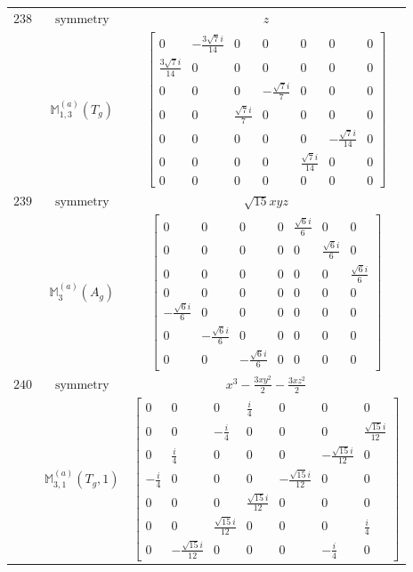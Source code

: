 \documentclass[fleqn,8pt,landscape]{jsarticle}
\begin{document}
\begin{longtable}{ccc}
$ 238 $ & $ \text{symmetry} $ & $ z $ \\
$  $ & $ \mathbb{M}_{1,3}^{(a)}(T_{g}) $ & $ \begin{bmatrix} 0 & - \frac{3 \sqrt{7} i}{14} & 0 & 0 & 0 & 0 & 0 \\ \frac{3 \sqrt{7} i}{14} & 0 & 0 & 0 & 0 & 0 & 0 \\ 0 & 0 & 0 & - \frac{\sqrt{7} i}{7} & 0 & 0 & 0 \\ 0 & 0 & \frac{\sqrt{7} i}{7} & 0 & 0 & 0 & 0 \\ 0 & 0 & 0 & 0 & 0 & - \frac{\sqrt{7} i}{14} & 0 \\ 0 & 0 & 0 & 0 & \frac{\sqrt{7} i}{14} & 0 & 0 \\ 0 & 0 & 0 & 0 & 0 & 0 & 0 \end{bmatrix} $ \\ \hline
$ 239 $ & $ \text{symmetry} $ & $ \sqrt{15} x y z $ \\
$  $ & $ \mathbb{M}_{3}^{(a)}(A_{g}) $ & $ \begin{bmatrix} 0 & 0 & 0 & 0 & \frac{\sqrt{6} i}{6} & 0 & 0 \\ 0 & 0 & 0 & 0 & 0 & \frac{\sqrt{6} i}{6} & 0 \\ 0 & 0 & 0 & 0 & 0 & 0 & \frac{\sqrt{6} i}{6} \\ 0 & 0 & 0 & 0 & 0 & 0 & 0 \\ - \frac{\sqrt{6} i}{6} & 0 & 0 & 0 & 0 & 0 & 0 \\ 0 & - \frac{\sqrt{6} i}{6} & 0 & 0 & 0 & 0 & 0 \\ 0 & 0 & - \frac{\sqrt{6} i}{6} & 0 & 0 & 0 & 0 \end{bmatrix} $ \\ \hline
$ 240 $ & $ \text{symmetry} $ & $ x^{3} - \frac{3 x y^{2}}{2} - \frac{3 x z^{2}}{2} $ \\
$  $ & $ \mathbb{M}_{3,1}^{(a)}(T_{g},1) $ & $ \begin{bmatrix} 0 & 0 & 0 & \frac{i}{4} & 0 & 0 & 0 \\ 0 & 0 & - \frac{i}{4} & 0 & 0 & 0 & \frac{\sqrt{15} i}{12} \\ 0 & \frac{i}{4} & 0 & 0 & 0 & - \frac{\sqrt{15} i}{12} & 0 \\ - \frac{i}{4} & 0 & 0 & 0 & - \frac{\sqrt{15} i}{12} & 0 & 0 \\ 0 & 0 & 0 & \frac{\sqrt{15} i}{12} & 0 & 0 & 0 \\ 0 & 0 & \frac{\sqrt{15} i}{12} & 0 & 0 & 0 & \frac{i}{4} \\ 0 & - \frac{\sqrt{15} i}{12} & 0 & 0 & 0 & - \frac{i}{4} & 0 \end{bmatrix} $ \\ \hline

\end{longtable}
\end{document}
